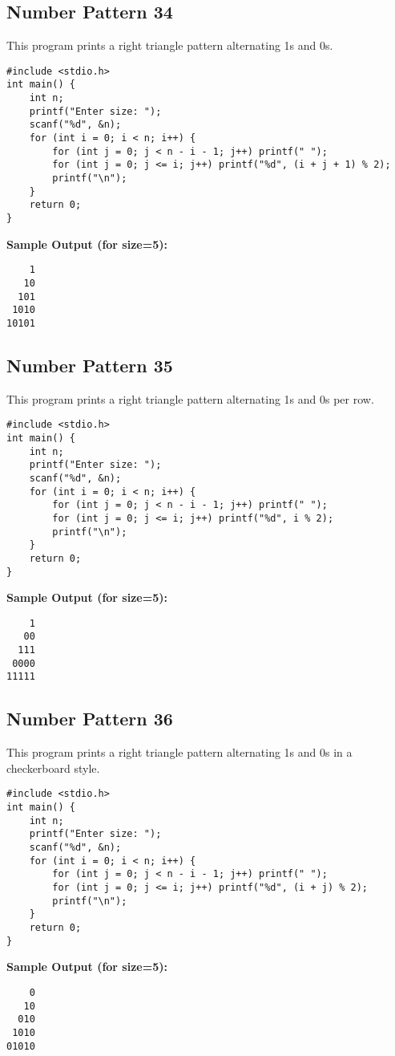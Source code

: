 \documentclass[a4paper,12pt]{article}
\begin{document}
\subsection{Number Pattern 34}
This program prints a right triangle pattern alternating 1s and 0s.
\begin{lstlisting}[caption={Number Pattern 34}]
#include <stdio.h>
int main() {
    int n;
    printf("Enter size: ");
    scanf("%d", &n);
    for (int i = 0; i < n; i++) {
        for (int j = 0; j < n - i - 1; j++) printf(" ");
        for (int j = 0; j <= i; j++) printf("%d", (i + j + 1) % 2);
        printf("\n");
    }
    return 0;
}
\end{lstlisting}
\textbf{Sample Output (for size=5):}
\begin{verbatim}
    1
   10
  101
 1010
10101
\end{verbatim}
\clearpage

\subsection{Number Pattern 35}
This program prints a right triangle pattern alternating 1s and 0s per row.
\begin{lstlisting}[caption={Number Pattern 35}]
#include <stdio.h>
int main() {
    int n;
    printf("Enter size: ");
    scanf("%d", &n);
    for (int i = 0; i < n; i++) {
        for (int j = 0; j < n - i - 1; j++) printf(" ");
        for (int j = 0; j <= i; j++) printf("%d", i % 2);
        printf("\n");
    }
    return 0;
}
\end{lstlisting}
\textbf{Sample Output (for size=5):}
\begin{verbatim}
    1
   00
  111
 0000
11111
\end{verbatim}
\clearpage

\subsection{Number Pattern 36}
This program prints a right triangle pattern alternating 1s and 0s in a checkerboard style.
\begin{lstlisting}[caption={Number Pattern 36}]
#include <stdio.h>
int main() {
    int n;
    printf("Enter size: ");
    scanf("%d", &n);
    for (int i = 0; i < n; i++) {
        for (int j = 0; j < n - i - 1; j++) printf(" ");
        for (int j = 0; j <= i; j++) printf("%d", (i + j) % 2);
        printf("\n");
    }
    return 0;
}
\end{lstlisting}
\textbf{Sample Output (for size=5):}
\begin{verbatim}
    0
   10
  010
 1010
01010
\end{verbatim}
\clearpage
\end{document}
